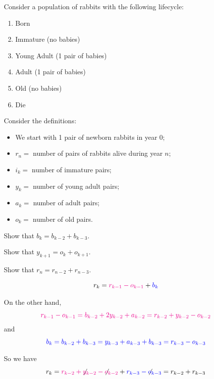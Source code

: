 	
\bookonlynewpage

\hfill

\bookonlynewpage


\begin{minipage}{.45\textwidth}
\question
	Consider a population of rabbits with the following lifecycle:
	\begin{enumerate}[start=0,label=(year \arabic*)]
		\item Born
		\item Immature (no babies)
		\item Young Adult (1 pair of babies)
		\item Adult (1 pair of babies)
		\item Old (no babies)
		\item Die \\[5pt]
	\end{enumerate}	
	
\end{minipage}
\qquad
\begin{minipage}{.45\textwidth}
	Consider the definitions:
	\begin{itemize}
		\item We start with 1 pair of newborn rabbits in year 0;
		\item $r_n=$ number of pairs of rabbits alive during year $n$;
		\item $i_k=$ number of immature pairs;
		\item $y_k=$ number of young adult pairs;
		\item $a_k=$ number of adult pairs;
		\item $o_k=$ number of old pairs.
	\end{itemize}

\end{minipage}

	\begin{parts}
		\item Show that $b_k=b_{k-2}+b_{k-3}$.
		\item Show that $y_{k+1}=o_{k}+o_{k+1}$.
		\item Show that $r_{n} = r_{n-2}+r_{n-3}$.
	\end{parts}

\begin{annotation}
\begin{goals}
$$
r_k 
	= {\color{magenta}r_{k-1}-o_{k-1}}+{\color{blue}b_k}
$$

On the other hand, 
$$
\color{magenta}
r_{k-1}-o_{k-1}
  = b_{k-2} + 2 y_{k-2} + a_{k-2} 
  = r_{k-2} + y_{k-2} - o_{k-2}
$$
and
$$
\color{blue}
b_k 
  = b_{k-2}+b_{k-3}
  = y_{k-3} + a_{k-3} + b_{k-3}
  = r_{k-3} - o_{k-3}
$$

So we have
$$
r_k = {\color{magenta}r_{k-2} + {\color{black}\not} y_{k-2} - {\color{black}\not} o_{k-2}} + {\color{blue}r_{k-3} - {\color{black}\not}o_{k-3}}
= r_{k-2} + r_{k-3}
$$
\end{goals}
\end{annotation}	

